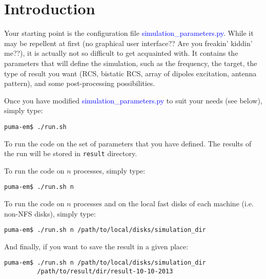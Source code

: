 \documentclass[a4paper,10pt]{book}
\newcommand{\file}[1] {\textcolor{blue}{\textsf{#1}}}
\begin{document}
\section{Introduction}
%
\par
Your starting point is the configuration file \file{simulation\_parameters.py}. While it may be repellent at first (no graphical user interface?? Are you freakin' kiddin' me??), it is actually not so difficult to get acquainted with. It contains the parameters that will define the simulation, such as the frequency, the target, the type of result you want (RCS, bistatic RCS, array of dipoles excitation, antenna pattern), and some post-processing possibilities. 
%
\par
Once you have modified \file{simulation\_parameters.py} to suit your needs (see below), simply type:
\begin{verbatim}
puma-em$ ./run.sh
\end{verbatim}
To run the code on the set of parameters that you have defined. The results of the run will be stored in \texttt{result} directory.
%
\par
To run the code on $n$ processes, simply type:
\begin{verbatim}
puma-em$ ./run.sh n
\end{verbatim}
%
\par
To run the code on $n$ processes and on the local fast disks of each machine (i.e. non-NFS disks), simply type:
\begin{verbatim}
puma-em$ ./run.sh n /path/to/local/disks/simulation_dir
\end{verbatim}
%
\par
And finally, if you want to save the result in a given place:
\begin{verbatim}
puma-em$ ./run.sh n /path/to/local/disks/simulation_dir 
         /path/to/result/dir/result-10-10-2013
\end{verbatim}
\end{document}
